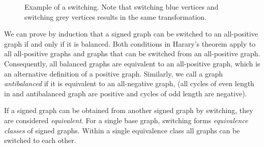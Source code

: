 \begin{figure}[h]
    \caption[Example of a switching]{Example of a switching. Note that switching blue vertices and switching grey vertices results in the same transformation.}
\end{figure}

We can prove by induction that a signed graph can be switched to an all-positive graph if and only if it is balanced. Both conditions in Harary's theorem apply to all all-positive graphs and graphs that can be switched from an all-positive graph. Consequently, all balanced graphs are equivalent to an all-positive graph, which is an alternative definition of a positive graph. Similarly, we call a graph \textit{antibalanced} if it is equivalent to an all-negative graph, (all cycles of even length in and antibalanced graph are positive and cycles of odd length are negative).

\begin{definition}
    If a signed graph can be obtained from another signed graph by switching, they are considered \textit{equivalent}. For a single base graph, switching forms \textit{equivalence classes} of signed graphs. Within a single equivalence class all graphs can be switched to each other.
\end{definition}

